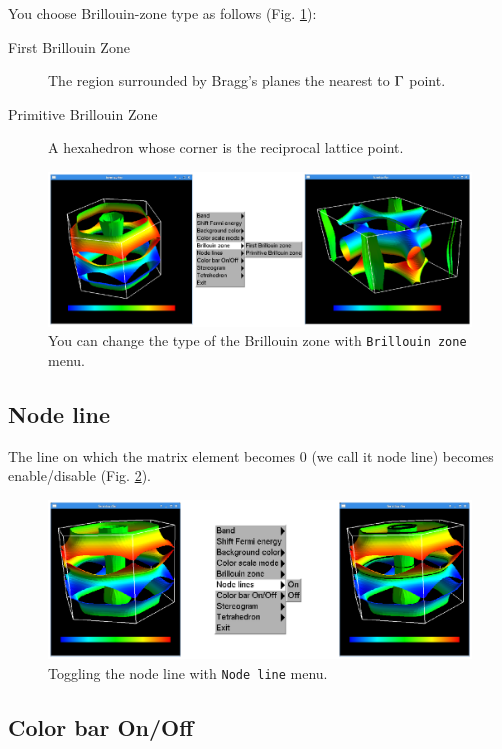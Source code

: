 \documentclass[12pt]{article}
\begin{document}
You choose Brillouin-zone type as follows (Fig. \ref{fig_brillouinzone}): 
\begin{description}
\item[First Brillouin Zone] The region surrounded by Bragg's planes
  the nearest to ${\rm \Gamma}$ point.
\item[Primitive Brillouin Zone] A hexahedron 
  whose corner is the reciprocal lattice point.
\end{description}

\begin{figure}[!ht]
  \includegraphics[width=17cm]{figs/brillouinzone.eps}
  \caption{You can change the type of the Brillouin zone 
    with \texttt{Brillouin zone} menu.}
  \label{fig_brillouinzone}
\end{figure}

\subsection{Node line}

The line on which the matrix element becomes 0 (we call it node line)
becomes enable/disable (Fig. \ref{fig_nodeline}).

\begin{figure}[!ht]
  \includegraphics[width=17cm]{figs/nodeline.eps}
  \caption{Toggling the node line with \texttt{Node line} menu.}
  \label{fig_nodeline}
\end{figure}

\subsection{Color bar On/Off}
\end{document}
